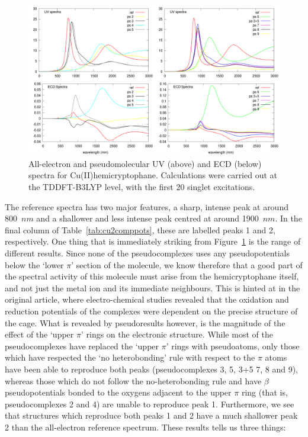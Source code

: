 \documentclass[aip,reprint,nofootinbib]{revtex4-1}
\begin{document}
\begin{figure}
\begin{center}
\includegraphics[width=15cm]{cages_split}
\caption[All-electron and pseudoCu(II)hemicryptophane spectra.]{All-electron and pseudomolecular UV (above) and ECD (below) spectra for Cu(II)hemicryptophane. Calculations were carried out at the TDDFT-B3LYP level, with the first 20 singlet excitations.}\label{fig:cu2spectra}
\end{center}
\end{figure}

The reference spectra has two major features, a sharp, intense peak at around 800~$nm$ and a shallower and less intense peak centred at around 1900~$nm$. In the final column of Table~\ref{tab:cu2comppots}, these are labelled peaks 1 and 2, respectively. One thing that is immediately striking from Figure~\ref{fig:cu2spectra} is the range of different results. Since none of the pseudocomplexes uses any pseudopotentials below the `lower $\pi$' section of the molecule, we know therefore that a good part of the spectral activity of this molecule must arise from the hemicryptophane itself, and not just the metal ion and its immediate neighbours. This is hinted at in the original article, where electro-chemical studies revealed that the oxidation and reduction potentials of the complexes were dependent on the precise structure of the cage. What is revealed by pseudoresults however, is the magnitude of the effect of the `upper $\pi$' rings on the electronic structure. While most of the pseudocomplexes have replaced the `upper $\pi$' rings with pseudoatoms, only those which have respected the `no heterobonding' rule with respect to the $\pi$ atoms have been able to reproduce both peaks (pseudocomplexes 3, 5, 3+5 7, 8 and 9), whereas those which do not follow the no-heterobonding rule and have $\beta$ pseudopotentials bonded to the oxygens adjacent to the upper $\pi$ ring (that is, pseudocomplexes 2 and 4) are unable to reproduce peak 1. Furthermore, we see that structures which reproduce both peaks 1 and 2 have a much shallower peak 2 than the all-electron reference spectrum. These results tells us three things: 
\end{document}

